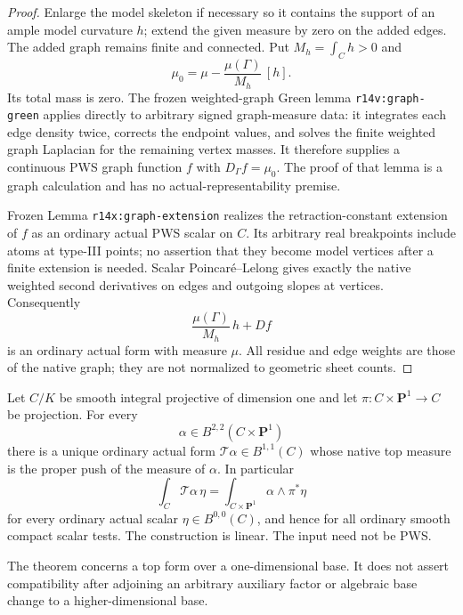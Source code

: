 \begin{proof}
Enlarge the model skeleton if necessary so it contains the
support of an ample model curvature $h$; extend the given
measure by zero on the added edges.  The added graph remains
finite and connected.  Put $M_h=\int_C h>0$ and
\[
             \mu_0=\mu-\frac{\mu(\Gamma)}{M_h}\,[h].
\tag{TC15.2}\label{r15tc:mass-normalization}
\]
Its total mass is zero.  The frozen weighted-graph Green lemma
\texttt{r14v:graph-green} applies directly to arbitrary signed
graph-measure data: it integrates each edge density twice,
corrects the endpoint values, and solves the finite weighted
graph Laplacian for the remaining vertex masses.  It therefore
supplies a continuous PWS graph function $f$ with
$D_\Gamma f=\mu_0$.  The proof of that lemma is a graph
calculation and has no actual-representability premise.

Frozen Lemma \texttt{r14x:graph-extension} realizes the
retraction-constant extension of $f$ as an ordinary actual
PWS scalar on $C$.  Its arbitrary real breakpoints include
atoms at type-III points; no assertion that they become model
vertices after a finite extension is needed.  Scalar
Poincar\'e--Lelong gives exactly the native weighted second
derivatives on edges and outgoing slopes at vertices.
Consequently
\[
                \frac{\mu(\Gamma)}{M_h}\,h+Df
\tag{TC15.3}\label{r15tc:realization}
\]
is an ordinary actual form with measure $\mu$.
All residue and edge weights are those of the native graph;
they are not normalized to geometric sheet counts.
\end{proof}

\begin{theorem}
\label{r15tc:projection}
Let $C/K$ be smooth integral projective of dimension one and
let $\pi:C\times\mathbf P^1\to C$ be projection.  For every
\[
                   \alpha\in B^{2,2}(C\times\mathbf P^1)
\]
there is a unique ordinary actual form
$\mathcal T\alpha\in B^{1,1}(C)$ whose native top measure is
the proper push of the measure of $\alpha$.  In particular
\[
     \int_C\mathcal T\alpha\,\eta
       =\int_{C\times\mathbf P^1}\alpha\wedge\pi^*\eta
\tag{TC15.4}\label{r15tc:pairing}
\]
for every ordinary actual scalar $\eta\in B^{0,0}(C)$,
and hence for all ordinary smooth compact scalar tests.
The construction is linear.  The input need not be PWS.

The theorem concerns a top form over a one-dimensional base.
It does not assert compatibility after adjoining an arbitrary
auxiliary factor or algebraic base change to a higher-dimensional
base.
\end{theorem}

